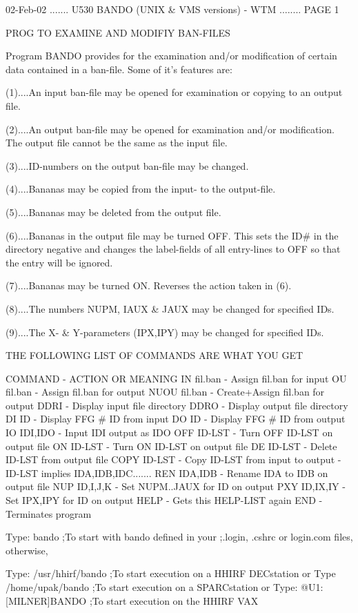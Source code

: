    02-Feb-02 ....... U530  BANDO (UNIX & VMS versions) - WTM ........ PAGE   1
 
                      PROG TO EXAMINE AND MODIFIY BAN-FILES
 
   Program  BANDO  provides for the examination and/or modification of certain
   data contained in a ban-file. Some of it's features are:
 
   (1)....An input ban-file may be opened for examination  or  copying  to  an
          output file.
 
   (2)....An  output  ban-file  may   be   opened   for   examination   and/or
          modification. The output file cannot be the same as the input file.
 
   (3)....ID-numbers on the output ban-file may be changed.
 
   (4)....Bananas may be copied from the input- to the output-file.
 
   (5)....Bananas may be deleted from the output file.
 
   (6)....Bananas  in  the output file may be turned OFF. This sets the ID# in
          the   directory   negative  and  changes  the  label-fields  of  all
          entry-lines to OFF so that the entry will be ignored.
 
   (7)....Bananas may be turned ON. Reverses the action taken in (6).
 
   (8)....The numbers NUPM, IAUX & JAUX may be changed for specified IDs.
 
   (9)....The X- & Y-parameters (IPX,IPY) may be changed for specified IDs.
 
                 THE FOLLOWING LIST OF COMMANDS ARE WHAT YOU GET
 
   COMMAND       - ACTION OR MEANING
   IN   fil.ban  - Assign fil.ban for input
   OU   fil.ban  - Assign fil.ban for output
   NUOU fil.ban  - Create+Assign fil.ban for output
   DDRI          - Display input  file directory
   DDRO          - Display output file directory
   DI   ID       - Display FFG # ID from input
   DO   ID       - Display FFG # ID from output
   IO   IDI,IDO  - Input IDI output as IDO
   OFF  ID-LST   - Turn OFF ID-LST on output file
   ON   ID-LST   - Turn  ON ID-LST on output file
   DE   ID-LST   - Delete ID-LST from   output file
   COPY ID-LST   - Copy ID-LST from input to output
                 - ID-LST implies IDA,IDB,IDC.......
   REN  IDA,IDB  - Rename IDA to IDB on output file
   NUP  ID,I,J,K - Set NUPM..JAUX for ID on output
   PXY  ID,IX,IY - Set IPX,IPY    for ID on output
   HELP          - Gets this HELP-LIST again
   END           - Terminates program
 
   Type: bando               ;To start with bando defined in your
                             ;.login, .cshrc or login.com files, otherwise,
 
   Type: /usr/hhirf/bando    ;To start execution on a HHIRF DECstation
   or
   Type  /home/upak/bando    ;To start execution on a SPARCstation
   or
   Type: @U1:[MILNER]BANDO   ;To start execution on the HHIRF VAX
